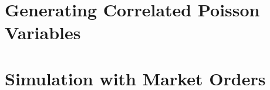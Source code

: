 \section{Generating Correlated Poisson Variables}
\begin{singlespacing}
\label{correlated-poisson}
\end{singlespacing}

\section{Simulation with Market Orders}
\begin{singlespacing}
\label{code:simulation}
\end{singlespacing}